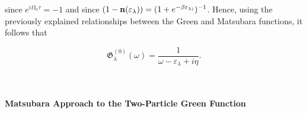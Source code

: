 since $e^{i\Omega_n \tau} = -1$ and since $(1-{\bf n}(\varepsilon_{\lambda})) = (1+e^{-\beta \varepsilon_{\lambda)}})^{-1}$. Hence, using the previously explained relationships between the Green and Matsubara functions, it follows that 

\begin{equation}
    \mathfrak{G}_{\lambda}^{(0)}(\omega) = \frac{1}{\omega - \varepsilon_{\lambda} + i \eta}. 
\end{equation}

\blanky \\

\paragraph{Matsubara Approach to the Two-Particle Green Function}
